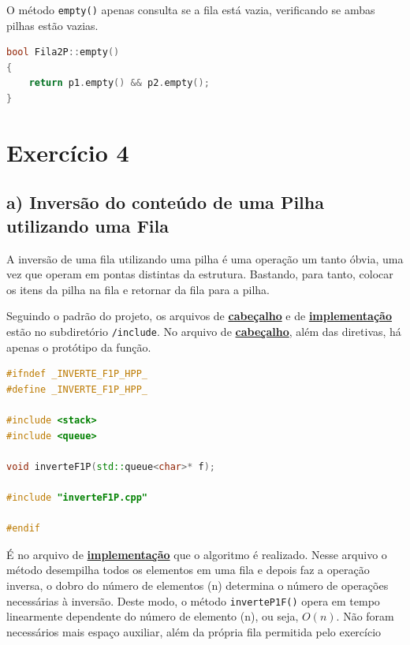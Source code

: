 \documentclass[
  brazilian,
  paper=a4,
  oneside  ,captions=tableheading
]{scrbook}
\newcommand{\passthrough}[1]{#1}
\begin{document}
O método \passthrough{\lstinline!empty()!} apenas consulta se a fila
está vazia, verificando se ambas pilhas estão vazias.

\begin{lstlisting}[language={C++}]
bool Fila2P::empty()
{
    return p1.empty() && p2.empty();
}
\end{lstlisting}

\hypertarget{exercuxedcio-4}{%
\chapter{Exercício 4}\label{exercuxedcio-4}}

\hypertarget{a-inversuxe3o-do-conteuxfado-de-uma-pilha-utilizando-uma-fila}{%
\section{a) Inversão do conteúdo de uma Pilha utilizando uma
Fila}\label{a-inversuxe3o-do-conteuxfado-de-uma-pilha-utilizando-uma-fila}}

A inversão de uma fila utilizando uma pilha é uma operação um tanto
óbvia, uma vez que operam em pontas distintas da estrutura. Bastando,
para tanto, colocar os itens da pilha na fila e retornar da fila para a
pilha.

Seguindo o padrão do projeto, os arquivos de
\href{https://github.com/ecostadelle/lista_pilhas_filas/blob/main/include/inverteF1P.hpp}{\textbf{cabeçalho}}
e de
\href{https://github.com/ecostadelle/lista_pilhas_filas/blob/main/include/inverteF1P.cpp}{\textbf{implementação}}
estão no subdiretório \passthrough{\lstinline!/include!}. No arquivo de
\href{https://github.com/ecostadelle/lista_pilhas_filas/blob/main/include/inverteF1P.hpp}{\textbf{cabeçalho}},
além das diretivas, há apenas o protótipo da função.

\begin{lstlisting}[language={C++}]
#ifndef _INVERTE_F1P_HPP_
#define _INVERTE_F1P_HPP_

#include <stack>
#include <queue>

void inverteF1P(std::queue<char>* f);

#include "inverteF1P.cpp"   

#endif
\end{lstlisting}

É no arquivo de
\href{https://github.com/ecostadelle/lista_pilhas_filas/blob/main/include/inverteF1P.cpp}{\textbf{implementação}}
que o algoritmo é realizado. Nesse arquivo o método desempilha todos os
elementos em uma fila e depois faz a operação inversa, o dobro do número
de elementos (n) determina o número de operações necessárias à inversão.
Deste modo, o método \passthrough{\lstinline!inverteP1F()!} opera em
tempo linearmente dependente do número de elemento (n), ou seja,
\(O(n)\). Não foram necessários mais espaço auxiliar, além da própria
fila permitida pelo exercício
\end{document}
